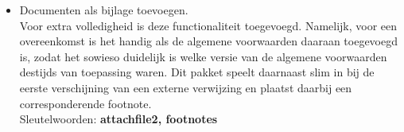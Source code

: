 \documentclass[11pt]{article}
\begin{document}
\begin{description}
\begin{itemize}
            \item Documenten als bijlage toevoegen.\\
            {
                \footnotesize Voor extra volledigheid is deze functionaliteit toegevoegd.
                Namelijk, voor een overeenkomst is het handig als de algemene voorwaarden daaraan toegevoegd is, zodat het sowieso duidelijk is welke versie van de algemene voorwaarden destijds van toepassing waren.
                Dit pakket speelt daarnaast slim in bij de eerste verschijning van een externe verwijzing en plaatst daarbij een corresponderende footnote.\\
                Sleutelwoorden: \textbf{attachfile2, footnotes}
            }
        \end{itemize}
    \end{description}
\end{document}
